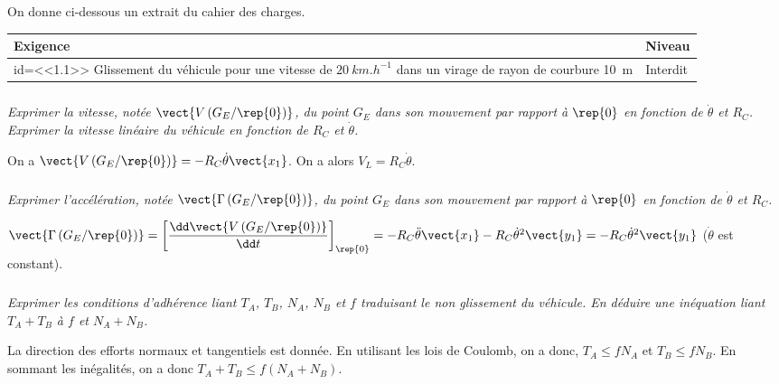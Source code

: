 \begin{multicols}{2}
\else
On donne ci-dessous un extrait du cahier des charges.

\begin{center}
\begin{tabular}{|p{.7\linewidth}|p{.2\linewidth}|}
\hline 
Exigence & Niveau \\
\hline
id=<<1.1>> Glissement du véhicule pour une vitesse de $\SI{20}{km.h^{-1}}$ dans un virage de rayon de courbure \SI{10}{m} 
& Interdit \\
\hline
\end{tabular}
\end{center}

\fi

\subparagraph{}\textit{Exprimer la vitesse, notée  $\vect{V\left(G_E /\rep{0}\right)}$, du point $G_E$ dans son mouvement par rapport à $\rep{0}$ en fonction de $\dot{\theta}$ et $R_C$. Exprimer la vitesse linéaire du véhicule en fonction de $R_C$ et $\dot{\theta}$.}

\ifprof
\begin{corrige}
On a $\vect{V\left(G_E /\rep{0}\right)}=-R_C\dot{\theta}\vect{x_1}$. On a alors $V_L=R_C\dot{\theta}$. 
\end{corrige}
\else
\fi

\ifnormal
\subparagraph{}\textit{Exprimer l'accélération, notée  $\vect{\Gamma \left(G_E /\rep{0}\right)}$, du point $G_E$ dans son mouvement par rapport à $\rep{0}$ en fonction de $\dot{\theta}$ et $R_C$.}
\else
\fi


\ifprof
\begin{corrige}
$\vect{\Gamma \left(G_E /\rep{0}\right)}=\left[\dfrac{\dd \vect{V\left(G_E /\rep{0}\right)}}{\dd t}\right]_{\rep{0}}= 
-R_C\ddot{\theta}\vect{x_1}-R_C\dot{\theta}^2\vect{y_1}=-R_C\dot{\theta}^2\vect{y_1}$ ($\dot{\theta}$ est constant).
\end{corrige}
\else
\fi

\ifnormal
\subparagraph{}\textit{Exprimer les conditions d'adhérence liant $T_A$, $T_B$, $N_A$, $N_B$ et $f$ traduisant le non glissement du véhicule. En déduire une inéquation liant $T_A + T_B$ à $f$ et $N_A + N_B$.}
\else
\fi

\ifprof
\begin{corrige}
La direction des efforts normaux et tangentiels est donnée. En utilisant les lois de Coulomb, on a donc, $T_A\leq fN_A$ et $T_B\leq fN_B$. En sommant les inégalités, on a donc $T_A+T_B\leq f\left(N_A+N_B\right)$.
\end{corrige}
\else
\fi


\end{multicols}
